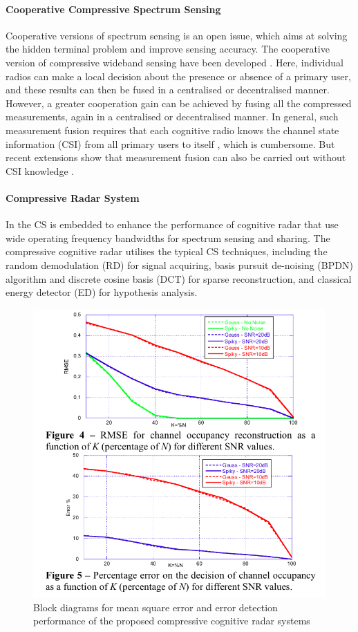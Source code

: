 \paragraph{Cooperative Compressive Spectrum Sensing} 
Cooperative versions of spectrum sensing is an open issue, which aims at solving the hidden terminal problem \cite{akyildiz2006next} and improve sensing accuracy. The cooperative version of compressive wideband sensing have
 been developed \cite{tian2008compressed, wang2009distributed}. Here, individual radios can make a local decision about the presence or absence of a primary user, and these results can then be fused in a centralised or decentralised manner. However, a greater cooperation gain can be achieved by fusing all the compressed measurements, again in a centralised or decentralised manner. In general, such measurement fusion requires that each cognitive radio knows the channel state information (CSI) from all primary users to itself \cite{tian2008compressed}, which is cumbersome. But recent extensions show that measurement fusion can also be carried out without CSI knowledge \cite{fanzi2011distributed}.

\paragraph{Compressive Radar System}
In \cite{stinco2014compressed} the CS is embedded to enhance the performance of cognitive radar that use wide operating frequency bandwidths for spectrum sensing and sharing. The compressive cognitive radar  utilises the typical CS techniques, including the random demodulation (RD) for signal acquiring, basis pursuit de-noising (BPDN) algorithm and discrete cosine basis (DCT) for sparse reconstruction, and classical energy detector (ED) for hypothesis analysis. 

\begin{figure}
\centering
\includegraphics[width=0.75\columnwidth]{figs/cs-cogn-radar.png}
\caption{Block diagrams for mean square error and error detection performance of the proposed compressive cognitive radar systems}
\label{cs-cogn-radar}
\end{figure} 

